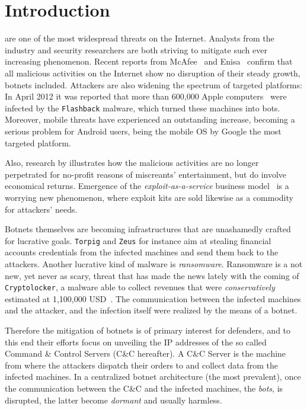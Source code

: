 
\chapter{Introduction} %
\label{chap:introduction}

 are one of the most widespread threats on the Internet. Analysts
from the industry and security researchers are both striving to mitigate such
ever increasing phenomenon. Recent reports from McAfee~\cite{mcafee2013} and
Enisa~\cite{enisa2013} confirm that all malicious activities on the Internet show
no disruption of their steady growth, botnets included.
Attackers are also widening the spectrum of targeted platforms: In April 2012
it was reported that more than 600,000 Apple computers~\cite{enisa2012} were infected
by the \texttt{Flashback} malware, which turned these machines into bots.
Moreover, mobile threats have experienced an
outstanding increase, becoming a serious problem for Android users, being
the mobile OS by Google the most targeted platform.

Also, research by \citet{grier2012manufacturing} illustrates how the malicious
activities are no longer perpetrated for no-profit reasons of miscreants'
entertainment, but do involve economical returns. Emergence of the
\emph{exploit-as-a-service} business model~\cite{grier2012manufacturing} is a worrying new phenomenon, where exploit kits are
sold likewise as a commodity for attackers' needs.

Botnets themselves are becoming infrastructures that are unashamedly crafted for
lucrative goals. \texttt{Torpig} and \texttt{Zeus} for instance aim at stealing
financial accounts credentials from the infected machines and send them back to the
attackers. Another lucrative kind of malware is \emph{ransomware}.
Ransomware is a not new, yet never as scary, threat that has made the news lately
with the coming of \texttt{Cryptolocker}, a malware able to collect revenues that
were \emph{conservatively} estimated at 1,100,000 USD~\cite{spagnuolo2013}.
The communication between the infected machines and the attacker, and the infection itself were realized by the means of a botnet.

Therefore the mitigation of botnets is of primary interest for defenders, and to
this end their efforts focus on unveiling the IP addresses of the so called
Command \& Control Servers (C\&C hereafter). A C\&C Server is the machine from
where the attackers dispatch their orders to and collect data from the infected
machines. In a centralized botnet architecture (the most prevalent), once the communication between
the C\&C and the infected machines, the \emph{bots}, is disrupted, the latter
become \emph{dormant} and usually harmless.

